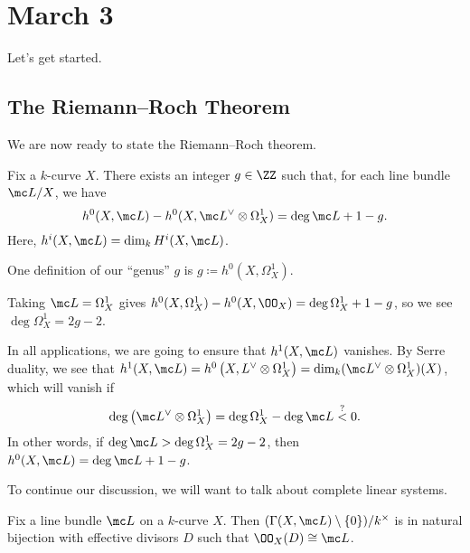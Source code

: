\documentclass[../notes.tex]{subfiles}
\begin{document}
\section{March 3}

Let's get started.

\subsection{The Riemann--Roch Theorem}
We are now ready to state the Riemann--Roch theorem.
\begin{theorem}
	Fix a $k$-curve $X$. There exists an integer $g\in\ZZ$ such that, for each line bundle $\mc L/X$, we have
	\[h^0(X,\mc L)-h^0(X,\mc L^\lor\otimes\Omega^1_X)=\deg\mc L+1-g.\]
	Here, $h^i(X,\mc L)=\dim_kH^i(X,\mc L)$.
\end{theorem}
\begin{remark}
	One definition of our ``genus'' $g$ is $g\coloneqq h^0\left(X,\Omega^1_X\right)$.
\end{remark}
\begin{example}
	Taking $\mc L=\Omega^1_X$ gives $h^0(X,\Omega^1_X)-h^0(X,\OO_X)=\deg\Omega^1_X+1-g$, so we see $\deg\Omega^1_X=2g-2$.
\end{example}
\begin{example}
	In all applications, we are going to ensure that $h^1(X,\mc L)$ vanishes. By Serre duality, we see that $h^1(X,\mc L)=h^0\left(X,L^\lor\otimes\Omega^1_X\right)=\dim_k(\mc L^\lor\otimes\Omega^1_X)(X)$, which will vanish if
	\[\deg\left(\mc L^{\lor}\otimes\Omega^1_X\right)=\deg\Omega^1_X-\deg\mc L\stackrel?<0.\]
	In other words, if $\deg\mc L>\deg\Omega^1_X=2g-2$, then $h^0(X,\mc L)=\deg\mc L+1-g$.
\end{example}
To continue our discussion, we will want to talk about complete linear systems.
\begin{proposition}
	Fix a line bundle $\mc L$ on a $k$-curve $X$. Then $(\Gamma(X,\mc L)\setminus\{0\})/k^\times$ is in natural bijection with effective divisors $D$ such that $\OO_X(D)\cong\mc L$.
\end{proposition}
\end{document}
